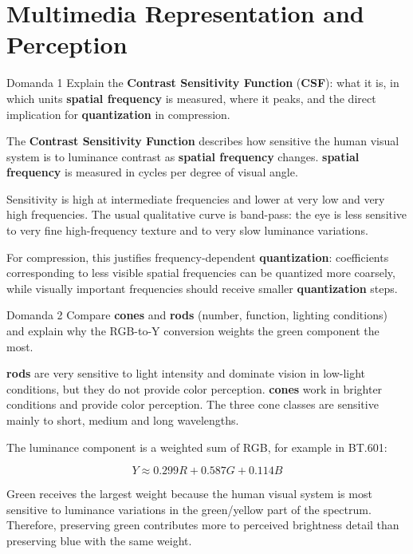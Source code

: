 \section{Multimedia Representation and Perception}




\begin{questionbox}{Domanda 1}
Explain the \textbf{Contrast Sensitivity Function} (\textbf{CSF}): what it is, in which units \textbf{spatial frequency} is measured, where it peaks, and the direct implication for \textbf{quantization} in compression.
\end{questionbox}


The \textbf{Contrast Sensitivity Function} describes how sensitive the human visual system is to luminance contrast as \textbf{spatial frequency} changes. \textbf{spatial frequency} is measured in cycles per degree of visual angle.

Sensitivity is high at intermediate frequencies and lower at very low and very high frequencies. The usual qualitative curve is band-pass: the eye is less sensitive to very fine high-frequency texture and to very slow luminance variations.

For compression, this justifies frequency-dependent \textbf{quantization}: coefficients corresponding to less visible spatial frequencies can be quantized more coarsely, while visually important frequencies should receive smaller \textbf{quantization} steps.



\begin{questionbox}{Domanda 2}
Compare \textbf{cones} and \textbf{rods} (number, function, lighting conditions) and explain why the RGB-to-Y conversion weights the green component the most.
\end{questionbox}


\textbf{rods} are very sensitive to light intensity and dominate vision in low-light conditions, but they do not provide color perception. \textbf{cones} work in brighter conditions and provide color perception. The three cone classes are sensitive mainly to short, medium and long wavelengths.

The luminance component is a weighted sum of RGB, for example in BT.601:


$$
Y \approx 0.299R + 0.587G + 0.114B
$$


Green receives the largest weight because the human visual system is most sensitive to luminance variations in the green/yellow part of the spectrum. Therefore, preserving green contributes more to perceived brightness detail than preserving blue with the same weight.



